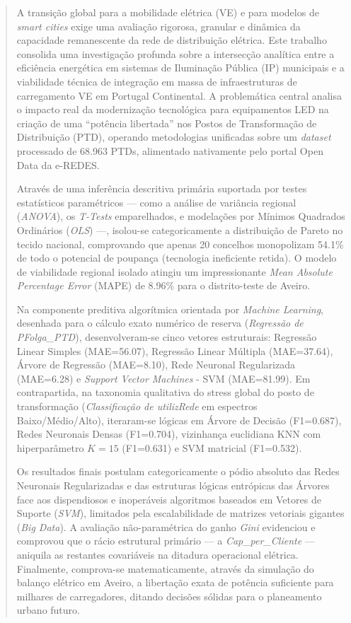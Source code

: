 \documentclass[conference]{IEEEtran}
\begin{document}
\begin{abstract}
A transição global para a mobilidade elétrica (VE) e para modelos de \textit{smart cities} exige uma avaliação rigorosa, granular e dinâmica da capacidade remanescente da rede de distribuição elétrica. Este trabalho consolida uma investigação profunda sobre a intersecção analítica entre a eficiência energética em sistemas de Iluminação Pública (IP) municipais e a viabilidade técnica de integração em massa de infraestruturas de carregamento VE em Portugal Continental. A problemática central analisa o impacto real da modernização tecnológica para equipamentos LED na criação de uma ``potência libertada'' nos Postos de Transformação de Distribuição (PTD), operando metodologias unificadas sobre um \textit{dataset} processado de 68.963 PTDs, alimentado nativamente pelo portal Open Data da e-REDES.

Através de uma inferência descritiva primária suportada por testes estatísticos paramétricos — como a análise de variância regional (\textit{ANOVA}), os \textit{T-Tests} emparelhados, e modelações por Mínimos Quadrados Ordinários (\textit{OLS}) —, isolou-se categoricamente a distribuição de Pareto no tecido nacional, comprovando que apenas 20 concelhos monopolizam 54.1\% de todo o potencial de poupança (tecnologia ineficiente retida). O modelo de viabilidade regional isolado atingiu um impressionante \textit{Mean Absolute Percentage Error} (MAPE) de 8.96\% para o distrito-teste de Aveiro.

Na componente preditiva algorítmica orientada por \textit{Machine Learning}, desenhada para o cálculo exato numérico de reserva (\textit{Regressão de PFolga\_PTD}), desenvolveram-se cinco vetores estruturais: Regressão Linear Simples (MAE=56.07), Regressão Linear Múltipla (MAE=37.64), Árvore de Regressão (MAE=8.10), Rede Neuronal Regularizada (MAE=6.28) e \textit{Support Vector Machines} - SVM (MAE=81.99). Em contrapartida, na taxonomia qualitativa do stress global do posto de transformação (\textit{Classificação de utilizRede} em espectros Baixo/Médio/Alto), iteraram-se lógicas em Árvore de Decisão (F1=0.687), Redes Neuronais Densas (F1=0.704), vizinhança euclidiana KNN com hiperparâmetro $K=15$ (F1=0.631) e SVM matricial (F1=0.532). 

Os resultados finais postulam categoricamente o pódio absoluto das Redes Neuronais Regularizadas e das estruturas lógicas entrópicas das Árvores face aos dispendiosos e inoperáveis algoritmos baseados em Vetores de Suporte (\textit{SVM}), limitados pela escalabilidade de matrizes vetoriais gigantes (\textit{Big Data}). A avaliação não-paramétrica do ganho \textit{Gini} evidenciou e comprovou que o rácio estrutural primário — a \textit{Cap\_per\_Cliente} — aniquila as restantes covariáveis na ditadura operacional elétrica. Finalmente, comprova-se matematicamente, através da simulação do balanço elétrico em Aveiro, a libertação exata de potência suficiente para milhares de carregadores, ditando decisões sólidas para o planeamento urbano futuro.
\end{abstract}
\end{document}
